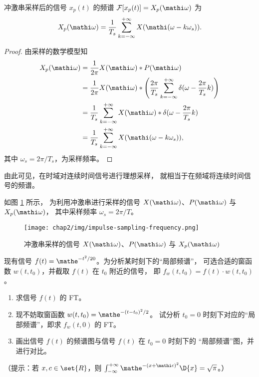 \begin{property}
    冲激串采样后的信号 $x_p(t)$ 的频谱 $\mathcal{F}[x_p(t)] = X_p(\mathi \omega)$ 为
    \begin{align*}
        X_p(\mathi \omega) = \frac{1}{T_s}\sum_{k = -\infty}^{+\infty}X(\mathi(\omega - k\omega_s)).
    \end{align*}
    \label{property:impulse-sampling-frequency-2}
\end{property}

\begin{proof}
    由采样的数学模型知
    \begin{align*}
        X_p(\mathi \omega) & = \frac{1}{2\pi}X(\mathi \omega) * P(\mathi \omega) \\
        & = \frac{1}{2\pi}X(\mathi \omega) * \left(\frac{2\pi}{T_s}\sum_{k = -\infty}^{+\infty}\delta(\omega - \frac{2\pi}{T_s}k)\right) \\
        & = \frac{1}{T_s}\sum_{k = -\infty}^{+\infty}X(\mathi \omega) * \delta(\omega - \frac{2\pi}{T_s}k) \\
        & = \frac{1}{T_s}\sum_{k = -\infty}^{+\infty}X(\mathi(\omega - k\omega_s)),
    \end{align*}
    其中 $\omega_s = 2\pi/T_s$，为采样频率。
\end{proof}

\begin{remark}
    由此可见，在时域对连续时间信号进行理想采样，
    就相当于在频域将连续时间信号的频谱。
\end{remark}

\begin{example}
    如图 \ref{fig:impulse-sampling-frequency} 所示，
    为利用冲激串进行采样的信号 $X(\mathi \omega)$、$P(\mathi \omega)$ 与 $X_p(\mathi \omega)$，
    其中采样频率 $\omega_s = 2\pi/T$。
    \begin{figure}[H]
        \centering
        \texttt{[image: chap2/img/impulse-sampling-frequency.png]}
        \caption{冲激串采样的信号 $X(\mathi \omega)$、$P(\mathi \omega)$ 与 $X_p(\mathi \omega)$}
        \label{fig:impulse-sampling-frequency}
    \end{figure}
\end{example}

\begin{homework}
    现有信号 $f(t) = \mathe^{-t^2/20}$。为分析某时刻下的``局部频谱''，
    可选合适的窗函数 $w(t, t_0)$，并截取 $f(t)$ 在 $t_0$ 附近的信号，
    即 $f_w(t, t_0) = f(t)\cdot w(t, t_0)$。
    \begin{enumerate}[label=(\arabic*)]
        \item 求信号 $f(t)$ 的 FT。
        \item 现不妨取窗函数 $w(t, t_0) = \mathe^{-(t - t_0)^2/2}$。
            试分析 $t_0 = 0$ 时刻下对应的``局部频谱''，即求 $f_w(t, 0)$ 的 FT。
        \item 画出信号 $f(t)$ 的频谱图与信号 $f(t)$ 在 $t_0 = 0$ 时刻下的
            ``局部频谱''图，并进行对比。
    \end{enumerate}
    （提示：若 $x, c \in \set{R}$，则 $\int_{-\infty}^{+\infty}\mathe^{-(x + \mathi c)^2}\D{x} = \sqrt{\pi}$。）
\end{homework}

